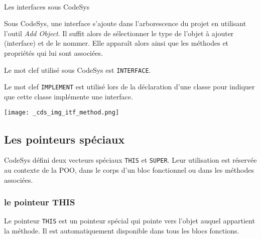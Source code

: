 \lstDeleteShortInline~
\begin{UPSTIactivite}
    \vspace{5cm}
\end{UPSTIactivite}

\begin{UPSTIinfor}{Les interfaces sous CodeSys}
    \begin{minipage}{.7\linewidth}
        Sous CodeSys, une interface s'ajoute dans l'arborescence du projet en utilisant l'outil \emph{Add Object}. Il suffit alors de sélectionner le type de l'objet à ajouter (interface) et de le nommer. Elle apparaît alors ainsi que les méthodes et propriétés qui lui sont associées. 
        
        Le mot clef utilisé sous CodeSys est \lstinline{INTERFACE}.


        Le mot clef \lstinline{IMPLEMENT} est utilisé lors de la déclaration d'une classe pour indiquer que cette classe implémente une interface.
        
    \end{minipage}
    \hfill
    \begin{minipage}{.25\linewidth}
        \centering
        \texttt{[image: \_cds\_img\_itf\_method.png]}
    \end{minipage}

\end{UPSTIinfor}

\subsection{Les pointeurs spéciaux}
CodeSys défini deux vecteurs spéciaux \lstinline{THIS} et \lstinline{SUPER}. Leur utilisation est réservée au contexte de la POO, dans le corps d'un bloc fonctionnel ou dans les méthodes associées.
\subsubsection{le pointeur THIS} 

Le pointeur \lstinline{THIS} est un pointeur spécial qui pointe vers l'objet auquel appartient la méthode. Il est automatiquement disponible dans tous les blocs fonctions. 

